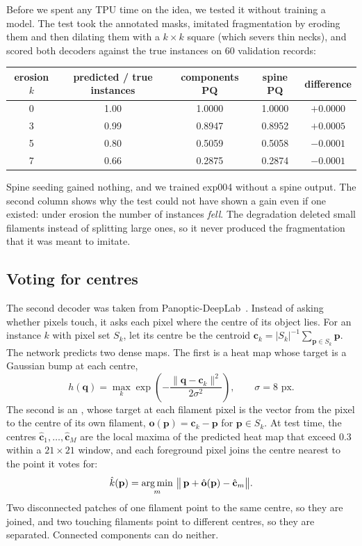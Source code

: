 Before we spent any TPU time on the idea, we tested it without training a model. The test took the
annotated masks, imitated fragmentation by eroding them and then dilating them with a $k\times k$
square (which severs thin necks), and scored both decoders against the true instances on 60
validation records:
\begin{center}\small
\begin{tabular}{@{}ccccc@{}}
\toprule
erosion $k$ & predicted / true instances & components PQ & spine PQ & difference \\
\midrule
0 & 1.00 & 1.0000 & 1.0000 & $+0.0000$ \\
3 & 0.99 & 0.8947 & 0.8952 & $+0.0005$ \\
5 & 0.80 & 0.5059 & 0.5058 & $-0.0001$ \\
7 & 0.66 & 0.2875 & 0.2874 & $-0.0001$ \\
\bottomrule
\end{tabular}
\end{center}
Spine seeding gained nothing, and we trained exp004 without a spine output. The second column shows
why the test could not have shown a gain even if one existed: under erosion the number of instances
\emph{fell}. The degradation deleted small filaments instead of splitting large ones, so it never
produced the fragmentation that it was meant to imitate.

\subsection{Voting for centres}\label{sec:par-offset}
The second decoder was taken from Panoptic-DeepLab~\citep{panopticdeeplab}. Instead of asking
whether pixels touch, it asks each pixel where the centre of its object lies. For an instance $k$
with pixel set $S_k$, let its centre be the centroid $\mathbf{c}_k = |S_k|^{-1}\sum_{\mathbf{p}\in
S_k}\mathbf{p}$. The network predicts two dense maps. The first is a heat map whose target is a
Gaussian bump at each centre,
\begin{equation}
h(\mathbf{q}) = \max_k \exp\!\left(-\frac{\lVert\mathbf{q}-\mathbf{c}_k\rVert^2}{2\sigma^2}\right),
\qquad \sigma = 8 \text{ px}.
\end{equation}
The second is an , whose target at each filament pixel is the vector from the
pixel to the centre of its own filament, $\mathbf{o}(\mathbf{p}) = \mathbf{c}_k - \mathbf{p}$ for
$\mathbf{p}\in S_k$. At test time, the centres $\hat{\mathbf{c}}_1,\dots,\hat{\mathbf{c}}_M$ are the
local maxima of the predicted heat map that exceed 0.3 within a $21\times21$ window, and each
foreground pixel joins the centre nearest to the point it votes for:
\begin{equation}
\hat k(\mathbf{p}) = \operatorname*{arg\,min}_{m}\,\big\lVert\, \mathbf{p} + \hat{\mathbf{o}}(\mathbf{p}) - \hat{\mathbf{c}}_m \big\rVert .
\label{eq:par-vote}
\end{equation}
Two disconnected patches of one filament point to the same centre, so they are joined, and two
touching filaments point to different centres, so they are separated. Connected components can do
neither.

